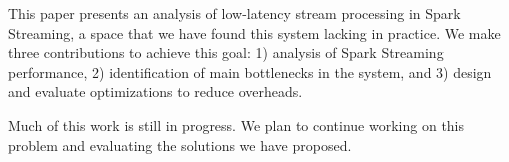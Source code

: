 This paper presents an analysis of low-latency stream processing in Spark Streaming, a space that we have found this system lacking in practice.
We make three contributions to achieve this goal: 1) analysis of Spark Streaming performance, 2) identification of main bottlenecks in the system, and 3) design and evaluate optimizations to reduce overheads.

Much of this work is still in progress. We plan to continue working on this problem and evaluating the solutions we have proposed. 
